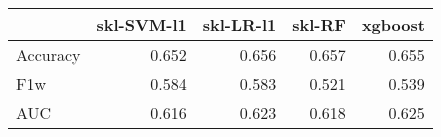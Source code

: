 \begin{tabular}{lrrrr}
\toprule
{} &  skl-SVM-l1 &  skl-LR-l1 &  skl-RF &  xgboost \\
\midrule
Accuracy &       0.652 &      0.656 &   0.657 &    0.655 \\
F1w      &       0.584 &      0.583 &   0.521 &    0.539 \\
AUC      &       0.616 &      0.623 &   0.618 &    0.625 \\
\bottomrule
\end{tabular}
